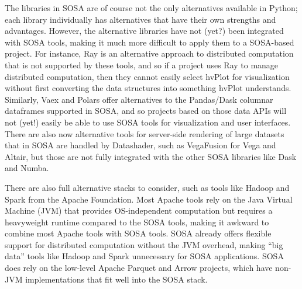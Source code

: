 The libraries in SOSA are of course not the only alternatives available in Python; each library individually has alternatives that have their own strengths and advantages. However, the alternative libraries have not (yet?) been integrated with SOSA tools, making it much more difficult to apply them to a SOSA-based project. For instance, Ray \cite{moritz:arxiv18} is an alternative approach to distributed computation that is not supported by these tools, and so if a project uses Ray to manage distributed computation, then they cannot easily select hvPlot for visualization without first converting the data structures into something hvPlot understands. Similarly, Vaex \cite{breddels:aaa18} and Polars \cite{ritche:polars} offer alternatives to the Pandas/Dask columnar dataframes supported in SOSA, and so projects based on those data APIs will not (yet!) easily be able to use SOSA tools for visualization and user interfaces. There are also now alternative tools for server-side rendering of large datasets that in SOSA are handled by Datashader, such as VegaFusion for Vega and Altair, but those are not fully integrated with the other SOSA libraries like Dask and Numba.

There are also full alternative stacks to consider, such as tools like Hadoop \cite{white:hadoop15} and Spark \cite{zaharia:cacm16} from the Apache Foundation. Most Apache tools rely on the Java Virtual Machine (JVM) that provides OS-independent computation but requires a heavyweight runtime compared to the SOSA tools, making it awkward to combine most Apache tools with SOSA tools. SOSA already offers flexible support for distributed computation without the JVM overhead, making ``big data'' tools like Hadoop and Spark unnecessary for SOSA applications. SOSA does rely on the low-level Apache Parquet and Arrow projects, which have non-JVM implementations that fit well into the SOSA stack.


